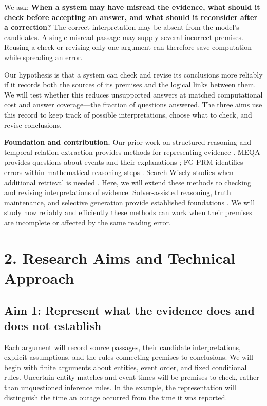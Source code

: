 \documentclass[12pt]{article}
\begin{document}
We ask: \textbf{When a system may have misread the evidence, what should it check before accepting an answer, and what should it reconsider after a correction?} The correct interpretation may be absent from the model's candidates. A single misread passage may supply several incorrect premises. Reusing a check or revising only one argument can therefore save computation while spreading an error.

Our hypothesis is that a system can check and revise its conclusions more reliably if it records both the sources of its premises and the logical links between them. We will test whether this reduces unsupported answers at matched computational cost and answer coverage---the fraction of questions answered. The three aims use this record to keep track of possible interpretations, choose what to check, and revise conclusions.

\textbf{Foundation and contribution.} Our prior work on structured reasoning and temporal relation extraction provides methods for representing evidence \citep{li2023structured,jin2023temporal}. MEQA provides questions about events and their explanations \citep{li2024meqa}; FG-PRM identifies errors within mathematical reasoning steps \citep{li2025fgprm}. Search Wisely studies when additional retrieval is needed \citep{wu2025search}. Here, we will extend these methods to checking and revising interpretations of evidence. Solver-assisted reasoning, truth maintenance, and selective generation provide established foundations \citep{lyu2023faithful,pan2023logiclm,dekleer1986atms,lee2024selective}. We will study how reliably and efficiently these methods can work when their premises are incomplete or affected by the same reading error.

\section*{2. Research Aims and Technical Approach}

\subsection*{Aim 1: Represent what the evidence does and does not establish}

Each argument will record source passages, their candidate interpretations, explicit assumptions, and the rules connecting premises to conclusions. We will begin with finite arguments about entities, event order, and fixed conditional rules. Uncertain entity matches and event times will be premises to check, rather than unquestioned inference rules. In the example, the representation will distinguish the time an outage occurred from the time it was reported.
\end{document}
